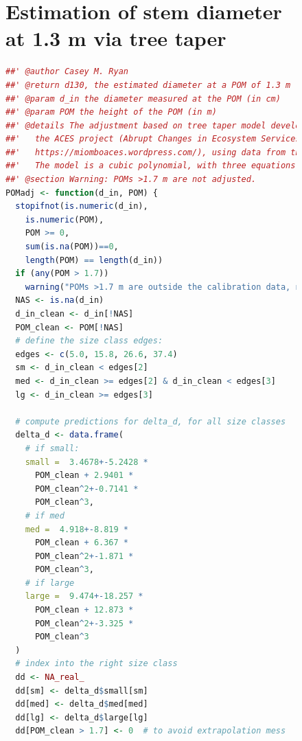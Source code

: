 \documentclass[diversity,article,submit,moreauthors,pdftex]{Definitions/mdpi}
\begin{document}
\begin{figure}[H]

\newpage{} 

\appendix

\section{Estimation of stem diameter at 1.3 m via tree taper} \label{appendixa}

\begin{lstlisting}[language=R]
##' @author Casey M. Ryan
##' @return d130, the estimated diameter at a POM of 1.3 m (in cm). 
##' @param d_in the diameter measured at the POM (in cm)
##' @param POM the height of the POM (in m)
##' @details The adjustment based on tree taper model developed as part of 
##'   the ACES project (Abrupt Changes in Ecosystem Services 
##'   https://miomboaces.wordpress.com/), using data from the miombo of Niassa. 
##'   The model is a cubic polynomial, with three equations for different sized stems. 
##' @section Warning: POMs >1.7 m are not adjusted.
POMadj <- function(d_in, POM) {
  stopifnot(is.numeric(d_in),
    is.numeric(POM),
    POM >= 0,
    sum(is.na(POM))==0,
    length(POM) == length(d_in))
  if (any(POM > 1.7))
    warning("POMs >1.7 m are outside the calibration data, no correction applied") 
  NAS <- is.na(d_in)
  d_in_clean <- d_in[!NAS]
  POM_clean <- POM[!NAS]
  # define the size class edges:
  edges <- c(5.0, 15.8, 26.6, 37.4)
  sm <- d_in_clean < edges[2]
  med <- d_in_clean >= edges[2] & d_in_clean < edges[3]
  lg <- d_in_clean >= edges[3]
  
  # compute predictions for delta_d, for all size classes
  delta_d <- data.frame(
    # if small:
    small =  3.4678+-5.2428 * 
   	  POM_clean + 2.9401 * 
      POM_clean^2+-0.7141 * 
      POM_clean^3,
    # if med
    med =  4.918+-8.819 * 
      POM_clean + 6.367 * 
      POM_clean^2+-1.871 * 
      POM_clean^3,
    # if large
    large =  9.474+-18.257 * 
      POM_clean + 12.873 * 
      POM_clean^2+-3.325 * 
      POM_clean^3
  )
  # index into the right size class
  dd <- NA_real_
  dd[sm] <- delta_d$small[sm]
  dd[med] <- delta_d$med[med]
  dd[lg] <- delta_d$large[lg]
  dd[POM_clean > 1.7] <- 0  # to avoid extrapolation mess
  

\end{lstlisting}
\end{figure}
\end{document}
